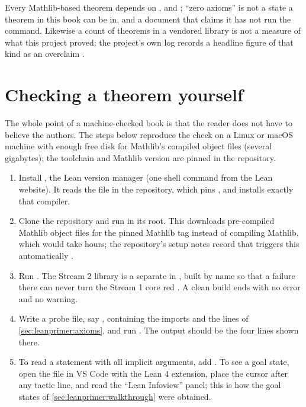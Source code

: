 \begin{pitfallbox}
Every Mathlib-based theorem depends on ,  and
; ``zero axioms'' is not a state a theorem in this book can be in, and a
document that claims it has not run the command. Likewise a count of theorems in a
vendored library is not a measure of what this project proved; the project's own log
records a headline figure of that kind as an overclaim .
\end{pitfallbox}

\section{Checking a theorem yourself}\label{sec:leanprimer:setup}

The whole point of a machine-checked book is that the reader does not have to believe the
authors. The steps below reproduce the check on a Linux or macOS machine with enough free disk for
Mathlib's compiled object files (several gigabytes); the toolchain and Mathlib version are
pinned in the repository.
\begin{enumerate}[leftmargin=*,itemsep=2pt]
\item Install , the Lean version manager (one shell command from the Lean
  website). It reads the file  in the repository, which pins
  , and installs exactly that compiler.
\item Clone the repository and run  in its root. This downloads
  pre-compiled Mathlib object files for the pinned Mathlib tag  instead of
  compiling Mathlib, which would take hours; the repository's setup notes record that
   triggers this automatically .
\item Run . The Stream 2 library is a separate
   in , built by name so that a failure there can never
  turn the Stream 1 core red . A clean build
  ends with no error and no  warning.
\item Write a probe file, say , containing the imports and the
   lines of \cref{sec:leanprimer:axioms}, and run
  . The output should be the four
  lines shown there.
\item To read a statement with all implicit arguments, add . To see a
  goal state, open the file in VS Code with the Lean 4 extension, place the cursor after
  any tactic line, and read the ``Lean Infoview'' panel; this is how the goal states of
  \cref{sec:leanprimer:walkthrough} were obtained.
\end{enumerate}

